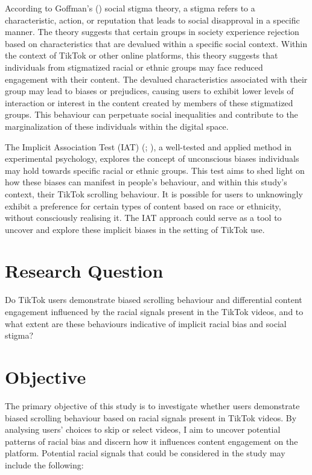 \documentclass[a4paper, 12pt]{article}   %
\begin{document}
According to Goffman's (\citeyear{goffmanStigmaNotesManagement1963}) social stigma theory, a stigma refers to a characteristic, action, or reputation that leads to social disapproval in a specific manner.
The theory suggests that certain groups in society experience rejection based on characteristics that are devalued within a specific social context. Within the context of TikTok or other online platforms, this theory suggests that individuals from stigmatized racial or ethnic groups may face reduced engagement with their content. The devalued characteristics associated with their group may lead to biases or prejudices, causing users to exhibit lower levels of interaction or interest in the content created by members of these stigmatized groups. This behaviour can perpetuate social inequalities and contribute to the marginalization of these individuals within the digital space.

The Implicit Association Test (IAT) (\cite{GreenwaldAnthonyG1995ISCA}; \cite{GreenwaldAnthonyG1998MIDi}), a well-tested and applied method in experimental psychology, explores the concept of unconscious biases individuals may hold towards specific racial or ethnic groups. This test aims to shed light on how these biases can manifest in people's behaviour, and within this study's context,  their TikTok scrolling behaviour. It is possible for users to unknowingly exhibit a preference for certain types of content based on race or ethnicity, without consciously realising it. The IAT approach could serve as a tool to uncover and explore these implicit biases in the setting of TikTok use. 



\section*{Research Question}
 Do TikTok users demonstrate biased scrolling behaviour and differential content engagement influenced by the racial signals present in the TikTok videos, and to what extent are these behaviours indicative of implicit racial bias and social stigma?


\section*{Objective}
The primary objective of this study is to investigate whether users demonstrate biased scrolling behaviour based on racial signals present in TikTok videos. By analysing users' choices to skip or select videos, I aim to uncover potential patterns of racial bias and discern how it influences content engagement on the platform.
Potential racial signals that could be considered in the study may include the following:
\end{document}
